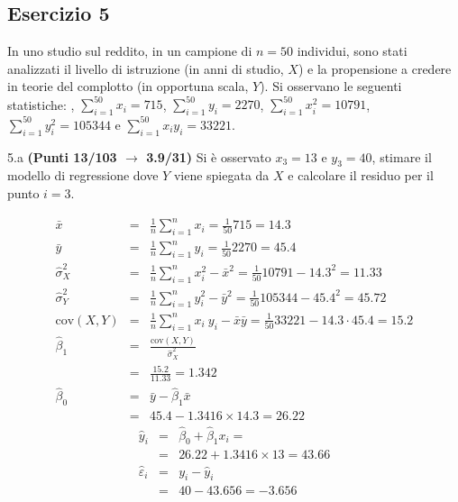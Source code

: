 \documentclass[
  11pt,
]{book}
\theoremstyle{mytheoremstyle}
\theoremstyle{mydefstyle}
\newenvironment{sol}
  {
  \begin{tcolorbox}[enhanced,breakable,arc=0.1mm,boxrule=1pt,colback=white,colframe=iblue,
  title=\bf \fontfamily{lmss}\selectfont \hspace{.5 cm} Soluzione,drop fuzzy shadow]

}{
\end{tcolorbox}
  }
\begin{document}
\subsection{Esercizio 5}\label{esercizio-5-33}

In uno studio sul reddito, in un campione di \(n=50\) individui, sono stati analizzati il livello di istruzione (in anni di studio, \(X\)) e la propensione a credere in teorie del complotto (in opportuna scala, \(Y\)).
Si osservano le seguenti statistiche:
, \(\sum_{i=1}^{50}x_i=715\), \(\sum_{i=1}^{50}y_i=2270\),
\(\sum_{i=1}^{50}x_i^2=10791\), \(\sum_{i=1}^{50}y_i^2=105344\) e \(\sum_{i=1}^{50}x_iy_i=33221\).

5.a \textbf{(Punti 13/103 \(\rightarrow\) 3.9/31)} Si è osservato \(x_3=13\) e \(y_3=40\), stimare il modello di regressione dove \(Y\) viene spiegata da \(X\) e calcolare il residuo per il punto \(i=3\).

\begin{sol}
\begin{eqnarray*}
           \bar x &=&\frac 1 n\sum_{i=1}^n x_i = \frac {1}{ 50 }  715 =  14.3 \\
           \bar y &=&\frac 1 n\sum_{i=1}^n y_i = \frac {1}{ 50 }  2270 =  45.4 \\
           \hat\sigma_X^2&=&\frac 1 n\sum_{i=1}^n x_i^2-\bar x^2=\frac {1}{ 50 }  10791  - 14.3 ^2= 11.33 \\
           \hat\sigma_Y^2&=&\frac 1 n\sum_{i=1}^n y_i^2-\bar y^2=\frac {1}{ 50 }  105344  - 45.4 ^2= 45.72 \\
           \text{cov}(X,Y)&=&\frac 1 n\sum_{i=1}^n x_i~y_i-\bar x\bar y=\frac {1}{ 50 }  33221 - 14.3 \cdot 45.4 = 15.2 \\
           \hat\beta_1 &=& \frac{\text{cov}(X,Y)}{\hat\sigma_X^2} \\
                    &=& \frac{ 15.2 }{ 11.33 }  =  1.342 \\
           \hat\beta_0 &=& \bar y - \hat\beta_1 \bar x\\
                    &=&  45.4 - 1.3416 \times  14.3 = 26.22 
         \end{eqnarray*}\begin{eqnarray*}
\hat y_i &=&\hat\beta_0+\hat\beta_1 x_i=\\ 
&=& 26.22 + 1.3416 \times 13 = 43.66 \\ 
\hat \varepsilon_i &=& y_i-\hat y_i\\ 
&=& 40 - 43.656 = -3.656  
\end{eqnarray*}

\end{sol}
\end{document}
